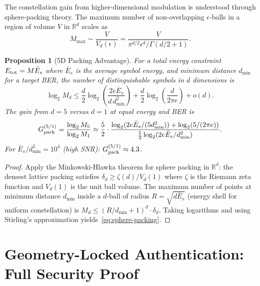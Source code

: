 \documentclass[twocolumn,superscriptaddress,prd,nofootinbib]{revtex4-2}
\newtheorem{proposition}[theorem]{Proposition}
\begin{document}
The constellation gain from higher-dimensional modulation is understood
through sphere-packing theory. The maximum number of non-overlapping
$\epsilon$-balls in a region of volume $V$ in $\mathbb{R}^d$ scales as
\begin{equation}
M_{\max} \sim \frac{V}{V_d(\epsilon)} = \frac{V}{\pi^{d/2}\epsilon^d/\Gamma(d/2+1)}.
\end{equation}

\begin{proposition}[5D Packing Advantage]
For a total energy constraint $E_{\rm tot} = M\bar{E}_s$ where
$\bar{E}_s$ is the average symbol energy, and minimum distance
$d_{\min}$ for a target BER, the number of distinguishable symbols in
$d$ dimensions is
\begin{equation}
\log_2 M_d \leq \frac{d}{2}\log_2\!\left(\frac{2e\bar{E}_s}{d\,d_{\min}^2}\right)
+ \frac{d}{2}\log_2\!\left(\frac{d}{2\pi e}\right) + o(d).
\label{eq:sphere-packing}
\end{equation}
The gain from $d=5$ versus $d=1$ at equal energy and BER is
\begin{equation}
G_{\rm pack}^{(5/1)} = \frac{\log_2 M_5}{\log_2 M_1}
\approx \frac{5}{2}\cdot\frac{\log_2(2e\bar{E}_s/(5d_{\min}^2))
+ \log_2(5/(2\pi e))}
{\frac{1}{2}\log_2(2e\bar{E}_s/d_{\min}^2)}.
\label{eq:packing-gain}
\end{equation}
For $\bar{E}_s/d_{\min}^2 = 10^4$ (high SNR):
$G_{\rm pack}^{(5/1)} \approx 4.3$.
\end{proposition}

\begin{proof}
Apply the Minkowski-Hlawka theorem for sphere packing in
$\mathbb{R}^d$: the densest lattice packing satisfies
$\delta_d \geq \zeta(d)/V_d(1)$ where $\zeta$ is the Riemann zeta
function and $V_d(1)$ is the unit ball volume. The maximum number of
points at minimum distance $d_{\min}$ inside a $d$-ball of radius
$R = \sqrt{d\bar{E}_s}$ (energy shell for uniform constellation) is
$M_d \leq (R/d_{\min}+1)^d \cdot \delta_d$. Taking logarithms and
using Stirling's approximation yields~\eqref{eq:sphere-packing}.
\end{proof}

\section{Geometry-Locked Authentication: Full Security Proof}
\label{sec:security}
\end{document}
